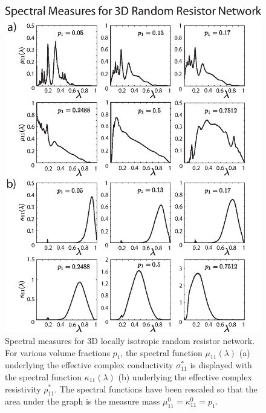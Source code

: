 \documentclass{cmslatex}
\begin{document}
%
\begin{figure}[t]
  \centerline{\includegraphics[scale=0.7]{3D_Spectral_Measures_Gamma_GammaCurl.eps}} 
\caption{Spectral measures for 3D locally isotropic random resistor
  network. For various volume fractions $p_1$, the spectral function
  $\mu_{11}(\lambda)$ (a) underlying the effective complex conductivity
  $\sigma^*_{11}$ is displayed with the spectral function $\kappa_{11}(\lambda)$ (b)  
  underlying the effective complex resistivity $\rho^*_{11}$. The
  spectral functions have been rescaled so that the area under the
  graph is the measure mass $\mu^0_{11}=\kappa^0_{11}=p_1$.                
        }
\label{fig:3D_Spectral_Measures}
\end{figure}
%
\end{document}
